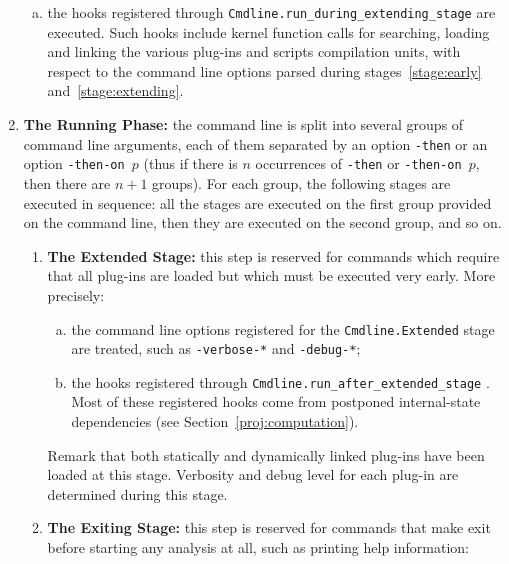 \begin{enumerate}[A --]
\begin{enumerate}[(a)]
  \item the hooks registered through
    \texttt{Cmdline.run\_during\_extending\_stage}
     are executed. Such
    hooks include kernel function calls for searching, loading and linking the
    various plug-ins and scripts compilation units, with respect to
    the command line options parsed during stages~\ref{stage:early}
    and~\ref{stage:extending}.
  \end{enumerate}

\item \textbf{The Running Phase:} the command line is split into several
  groups of command line arguments, each of them separated by an option
  \texttt{-then} or an option \texttt{-then-on $p$} (thus if there is $n$
  occurrences of \texttt{-then} or \texttt{-then-on $p$}, then there are $n+1$
  groups). For each group, the following stages are executed in sequence: all
  the stages are executed on the first group provided on the command line, then
  they are executed on the second group, and so on.

\begin{enumerate}[1.]

\item \textbf{The Extended Stage:} this step is reserved for commands which
  require that all plug-ins are loaded but which must be executed very
  early. More precisely:

  \begin{enumerate}[(a)]
  \item the command line options registered for the
    \texttt{Cmdline.Extended} stage
    are treated, such as \texttt{-verbose-*} and \texttt{-debug-*};

  \item the hooks registered through
    \texttt{Cmdline.run\_after\_extended\_stage}%
    .
    Most of these registered hooks come from postponed internal-state
    dependencies (see
    Section~\ref{proj:computation}).
  \end{enumerate}

  Remark that both statically and dynamically linked plug-ins have
  been loaded at this stage. Verbosity and debug level for each
  plug-in are determined during this stage.

\item \textbf{The Exiting Stage:} this step is reserved for commands
  that make \framac exit before starting any analysis at all, such as
  printing help information:
  \begin{enumerate}[(a)]


\end{enumerate}
\end{enumerate}
\end{enumerate}
